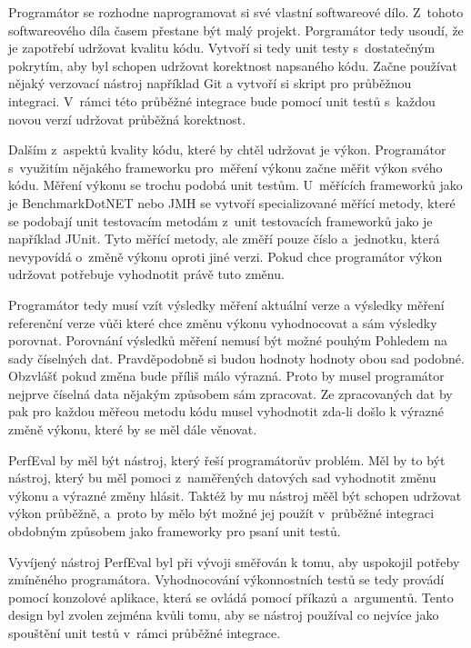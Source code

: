 Programátor se rozhodne naprogramovat si své vlastní softwareové dílo. Z~tohoto softwareového díla
časem přestane být malý projekt. Porgramátor tedy usoudí, že je zapotřebí udržovat kvalitu kódu.
Vytvoří si tedy unit testy s~dostatečným pokrytím, aby byl schopen udržovat korektnost napsaného kódu.
Začne používat nějaký verzovací nástroj například Git a vytvoří si skript pro průběžnou integraci.
V~rámci této průběžné integrace bude pomocí unit testů s~každou novou verzí udržovat průběžná korektnost.

Dalším z~aspektů kvality kódu, které by chtěl udržovat je výkon. Programátor s~využitím nějakého frameworku pro~měření výkonu začne měřit výkon svého kódu.
Měření výkonu se trochu podobá unit testům. U~měřících frameworků jako je BenchmarkDotNET nebo JMH se vytvoří specializované měřící metody,
které se podobají unit testovacím metodám z~unit testovacích frameworků jako je například JUnit.
Tyto měřící metody, ale změří pouze číslo a~jednotku, která nevypovídá o~změně výkonu oproti jiné verzi.
Pokud chce programátor výkon udržovat potřebuje vyhodnotit právě tuto změnu.

Programátor tedy musí vzít výsledky měření aktuální verze a výsledky měření referenční verze vůči které chce
změnu výkonu vyhodnocovat a sám výsledky porovnat. Porovnání výsledků měření nemusí být možné pouhým Pohledem
na sady číselných dat. Pravděpodobně si budou hodnoty hodnoty obou sad podobné. Obzvlášť pokud změna bude příliš málo výrazná.
Proto by musel programátor nejprve číselná data nějakým způsobem sám zpracovat. Ze zpracovaných dat by pak pro každou měřeou metodu
kódu musel vyhodnotit zda-li došlo k výrazné změně výkonu, které by se měl dále věnovat.

PerfEval by měl být nástroj, který řeší programátorův problém. Měl by to být nástroj, který bu měl pomoci
z~naměřených datových sad vyhodnotit změnu výkonu a výrazné změny hlásit. Taktéž by mu nástroj měěl být schopen
udržovat výkon průběžně, a~proto by mělo být možné jej použít v~průběžné integraci obdobným způsobem jako frameworky
pro psaní unit testů.

Vyvíjený nástroj PerfEval byl při vývoji směřován k tomu, aby uspokojil potřeby zmíněného programátora.
Vyhodnocování výkonnostních testů se tedy provádí pomocí konzolové aplikace, která se ovládá pomocí
příkazů a~argumentů. Tento design byl zvolen zejména kvůli tomu, aby se nástroj používal co nejvíce
jako spouštění unit testů v~rámci průběžné integrace.
